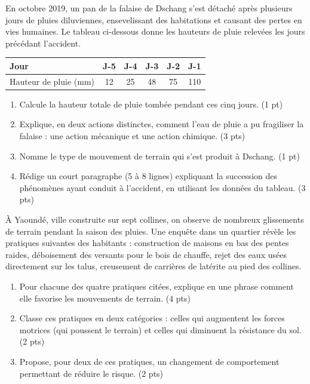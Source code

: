 \documentclass[11pt]{article}
\begin{document}
\begin{exercice}
En octobre 2019, un pan de la falaise de Dschang s'est détaché après plusieurs jours de pluies diluviennes, ensevelissant des habitations et causant des pertes en vies humaines. Le tableau ci-dessous donne les hauteurs de pluie relevées les jours précédant l'accident.

\begin{center}
\begin{tabular}{|l|c|c|c|c|c|}
\hline
Jour & J-5 & J-4 & J-3 & J-2 & J-1 \\
\hline
Hauteur de pluie (mm) & 12 & 25 & 48 & 75 & 110 \\
\hline
\end{tabular}
\end{center}

\begin{enumerate}
\item Calcule la hauteur totale de pluie tombée pendant ces cinq jours. \hfill (1 pt)
\item Explique, en deux actions distinctes, comment l'eau de pluie a pu fragiliser la falaise : une action mécanique et une action chimique. \hfill (3 pts)
\item Nomme le type de mouvement de terrain qui s'est produit à Dschang. \hfill (1 pt)
\item Rédige un court paragraphe (5 à 8 lignes) expliquant la succession des phénomènes ayant conduit à l'accident, en utilisant les données du tableau. \hfill (3 pts)
\end{enumerate}
\end{exercice}

\begin{exercice}
À Yaoundé, ville construite sur sept collines, on observe de nombreux glissements de terrain pendant la saison des pluies. Une enquête dans un quartier révèle les pratiques suivantes des habitants : construction de maisons en bas des pentes raides, déboisement des versants pour le bois de chauffe, rejet des eaux usées directement sur les talus, creusement de carrières de latérite au pied des collines.
\begin{enumerate}
\item Pour chacune des quatre pratiques citées, explique en une phrase comment elle favorise les mouvements de terrain. \hfill (4 pts)
\item Classe ces pratiques en deux catégories : celles qui augmentent les forces motrices (qui poussent le terrain) et celles qui diminuent la résistance du sol. \hfill (2 pts)
\item Propose, pour deux de ces pratiques, un changement de comportement permettant de réduire le risque. \hfill (2 pts)
\end{enumerate}
\end{exercice}
\end{document}
